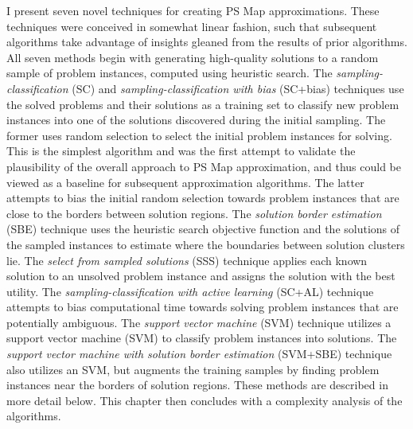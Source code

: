 I present seven novel techniques for creating PS Map approximations.  These techniques were conceived in somewhat linear fashion, such that subsequent algorithms take advantage of insights gleaned from the results of prior algorithms.  All seven methods begin with generating high-quality solutions to a random sample of problem instances, computed using heuristic search.  The \textit{sampling-classification} (SC) and \textit{sampling-classification with bias} (SC+bias) techniques use the solved problems and their  solutions as a training set to classify new problem instances into one of the solutions discovered during the initial sampling.  The former uses random selection to select the initial problem instances for solving.  This is the simplest algorithm and was the first attempt to validate the plausibility of the overall approach to PS Map approximation, and thus could be viewed as a baseline for subsequent approximation algorithms.  The latter attempts to bias the initial random selection towards problem instances that are close to the borders between solution regions. The \textit{solution border estimation} (SBE) technique uses the heuristic search objective function and the solutions of the sampled instances to estimate where the boundaries between solution clusters lie.  The \textit{select from sampled solutions} (SSS) technique applies each known solution to an unsolved problem instance and assigns the solution with the best utility.  The \textit{sampling-classification with active learning} (SC+AL) technique attempts to bias computational time towards solving problem instances  that are potentially ambiguous.  The \textit{support vector machine} (SVM) technique utilizes a support vector machine (SVM) to classify problem instances into solutions.  The \textit{support vector machine with solution border estimation} (SVM+SBE) technique also utilizes an SVM, but augments the training samples by finding problem instances near the borders of solution regions.  These methods are described in more detail below.  This chapter then concludes with a complexity analysis of the algorithms.



